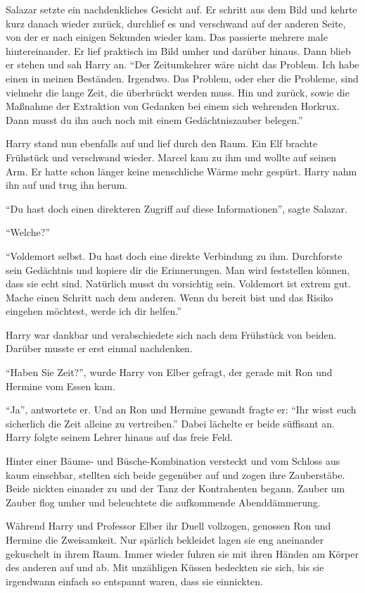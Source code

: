 Salazar setzte ein nachdenkliches Gesicht auf. Er schritt aus dem Bild und kehrte kurz danach wieder zurück, durchlief es und verschwand auf der anderen Seite, von der er nach einigen Sekunden wieder kam. Das passierte mehrere male hintereinander. Er lief praktisch im Bild umher und darüber hinaus. Dann blieb er stehen und sah Harry an. \enquote{Der Zeitumkehrer wäre nicht das Problem. Ich habe einen in meinen Beständen. Irgendwo. Das Problem, oder eher die Probleme, sind vielmehr die lange Zeit, die überbrückt werden muss. Hin und zurück, sowie die Maßnahme der Extraktion von Gedanken bei einem sich wehrenden Horkrux. Dann musst du ihn auch noch mit einem Gedächtniszauber belegen.}

Harry stand nun ebenfalls auf und lief durch den Raum. Ein Elf brachte Frühstück und verschwand wieder. Marcel kam zu ihm und wollte auf seinen Arm. Er hatte schon länger keine menschliche Wärme mehr gespürt. Harry nahm ihn auf und trug ihn herum.

\enquote{Du hast doch einen direkteren Zugriff auf diese Informationen}, sagte Salazar.

\enquote{Welche?}

\enquote{Voldemort selbst. Du hast doch eine direkte Verbindung zu ihm. Durchforste sein Gedächtnis und kopiere dir die Erinnerungen. Man wird feststellen können, dass sie echt sind. Natürlich musst du vorsichtig sein. Voldemort ist extrem gut. Mache einen Schritt nach dem anderen. Wenn du bereit bist und das Risiko eingehen möchtest, werde ich dir helfen.}

Harry war dankbar und verabschiedete sich nach dem Frühstück von beiden. Darüber musste er erst einmal nachdenken.

\trenn

\enquote{Haben Sie Zeit?}, wurde Harry von Elber gefragt, der gerade mit Ron und Hermine vom Essen kam.

\enquote{Ja}, antwortete er. Und an Ron und Hermine gewandt fragte er: \enquote{Ihr wisst euch sicherlich die Zeit alleine zu vertreiben.} Dabei lächelte er beide süffisant an. Harry folgte seinem Lehrer hinaus auf das freie Feld.

Hinter einer Bäume- und Büsche-Kombination versteckt und vom Schloss aus kaum einsehbar, stellten sich beide gegenüber auf und zogen ihre Zauberstäbe. Beide nickten einander zu und der Tanz der Kontrahenten begann. Zauber um Zauber flog umher und beleuchtete die aufkommende Abenddämmerung.

Während Harry und Professor Elber ihr Duell vollzogen, genossen Ron und Hermine die Zweisamkeit. Nur spärlich bekleidet lagen sie eng aneinander gekuschelt in ihrem Raum. Immer wieder fuhren sie mit ihren Händen am Körper des anderen auf und ab. Mit unzähligen Küssen bedeckten sie sich, bis sie irgendwann einfach so entspannt waren, dass sie einnickten.

